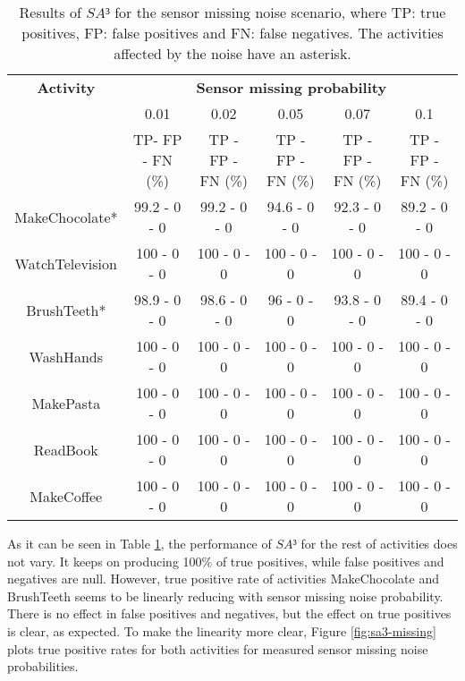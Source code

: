 \begin{table}[htbp]\scriptsize
  \begin{center}
        \begin{tabular}{cccccc}
            \hline            
            \textbf{Activity} & \multicolumn{5}{c}{\textbf{Sensor missing probability}}\\
             & 0.01 & 0.02 & 0.05 & 0.07 & 0.1 \\
             & TP- FP - FN (\%) & TP - FP - FN (\%) & TP - FP - FN (\%) & TP - FP - FN (\%) & TP - FP - FN (\%)\\
            \hline
            MakeChocolate*   & 99.2 - 0 - 0 & 99.2 - 0 - 0 & 94.6 - 0 - 0 & 92.3 - 0 - 0 & 89.2 - 0 - 0 \\
	    WatchTelevision  & 100 - 0 - 0 & 100 - 0 - 0 & 100 - 0 - 0 & 100 - 0 - 0 & 100 - 0 - 0 \\
	    BrushTeeth*      & 98.9 - 0 - 0 & 98.6 - 0 - 0 & 96 - 0 - 0 & 93.8 - 0 - 0 & 89.4 - 0 - 0 \\
	    WashHands        & 100 - 0 - 0 & 100 - 0 - 0 & 100 - 0 - 0 & 100 - 0 - 0 & 100 - 0 - 0 \\
	    MakePasta        & 100 - 0 - 0 & 100 - 0 - 0 & 100 - 0 - 0 & 100 - 0 - 0 & 100 - 0 - 0 \\
	    ReadBook         & 100 - 0 - 0 & 100 - 0 - 0 & 100 - 0 - 0 & 100 - 0 - 0 & 100 - 0 - 0 \\
	    MakeCoffee       & 100 - 0 - 0 & 100 - 0 - 0 & 100 - 0 - 0 & 100 - 0 - 0 & 100 - 0 - 0 \\
            \hline
        \end{tabular}                
        \caption{Results of $SA³$ for the sensor missing noise scenario, where TP: true positives, FP: false positives and FN: false negatives. The activities affected by the noise have an asterisk.}
        \label{tab-sa3-missing}
    \end{center}
\end{table}

As it can be seen in Table \ref{tab-sa3-missing}, the performance of $SA³$ for the rest of activities does not vary. It keeps on producing 100\% of true positives, while false positives and negatives are null. However, true positive rate of activities MakeChocolate and BrushTeeth seems to be linearly reducing with sensor missing noise probability. There is no effect in false positives and negatives, but the effect on true positives is clear, as expected. To make the linearity more clear, Figure \ref{fig:sa3-missing} plots true positive rates for both activities for measured sensor missing noise probabilities. 

